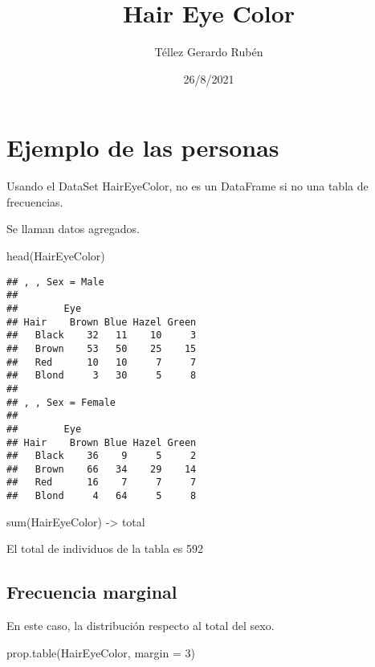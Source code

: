 \documentclass[
]{article}
\title{Hair Eye Color}
\author{Téllez Gerardo Rubén}
\date{26/8/2021}
\newenvironment{Shaded}{\begin{snugshade}}{\end{snugshade}}
\newcommand{\AttributeTok}[1]{\textcolor[rgb]{0.77,0.63,0.00}{#1}}
\newcommand{\DecValTok}[1]{\textcolor[rgb]{0.00,0.00,0.81}{#1}}
\newcommand{\FunctionTok}[1]{\textcolor[rgb]{0.00,0.00,0.00}{#1}}
\newcommand{\NormalTok}[1]{#1}
\newcommand{\OtherTok}[1]{\textcolor[rgb]{0.56,0.35,0.01}{#1}}
\begin{document}
\maketitle

\hypertarget{ejemplo-de-las-personas}{%
\section{Ejemplo de las personas}\label{ejemplo-de-las-personas}}

Usando el DataSet HairEyeColor, no es un DataFrame si no una tabla de
frecuencias.

Se llaman datos agregados.

\begin{Shaded}
\begin{Highlighting}[]
\FunctionTok{head}\NormalTok{(HairEyeColor)}
\end{Highlighting}
\end{Shaded}

\begin{verbatim}
## , , Sex = Male
## 
##        Eye
## Hair    Brown Blue Hazel Green
##   Black    32   11    10     3
##   Brown    53   50    25    15
##   Red      10   10     7     7
##   Blond     3   30     5     8
## 
## , , Sex = Female
## 
##        Eye
## Hair    Brown Blue Hazel Green
##   Black    36    9     5     2
##   Brown    66   34    29    14
##   Red      16    7     7     7
##   Blond     4   64     5     8
\end{verbatim}

\begin{Shaded}
\begin{Highlighting}[]
\FunctionTok{sum}\NormalTok{(HairEyeColor) }\OtherTok{{-}\textgreater{}}\NormalTok{ total}
\end{Highlighting}
\end{Shaded}

El total de individuos de la tabla es 592

\hypertarget{frecuencia-marginal}{%
\subsection{Frecuencia marginal}\label{frecuencia-marginal}}

En este caso, la distribución respecto al total del sexo.

\begin{Shaded}
\begin{Highlighting}[]
\FunctionTok{prop.table}\NormalTok{(HairEyeColor, }\AttributeTok{margin =} \DecValTok{3}\NormalTok{)}
\end{Highlighting}
\end{Shaded}
\end{document}
